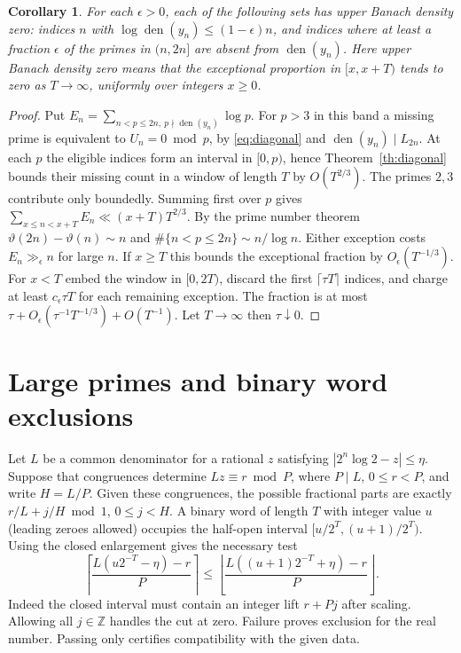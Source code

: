 \documentclass[11pt]{article}
\newtheorem{corollary}[theorem]{Corollary}
\DeclareMathOperator{\den}{den}
\newcommand{\Z}{\mathbb Z}
\begin{document}
\begin{corollary}\label{cor:uniform}
For each $\epsilon>0$, each of the following sets has upper Banach density zero:
indices $n$ with $\log\den(y_n)\le(1-\epsilon)n$, and indices where at least
a fraction $\epsilon$ of the primes in $(n,2n]$ are absent from $\den(y_n)$.
Here upper Banach density zero means that the exceptional proportion in
$[x,x+T)$ tends to zero as $T\to\infty$, uniformly over integers $x\ge0$.
\end{corollary}
\begin{proof}
Put $E_n=\sum_{n<p\le2n,\ p\nmid\den(y_n)}\log p$. For $p>3$ in this band
a missing prime is equivalent to $U_n=0\bmod p$, by \eqref{eq:diagonal}
and $\den(y_n)\mid L_{2n}$. At each $p$ the eligible indices form an interval
in $[0,p)$, hence Theorem~\ref{th:diagonal} bounds their missing count in a
window of length $T$ by $O(T^{2/3})$. The primes $2,3$ contribute only
boundedly. Summing first over $p$ gives
$\sum_{x\le n<x+T}E_n\ll (x+T)T^{2/3}$.
By the prime number theorem $\vartheta(2n)-\vartheta(n)\sim n$ and
$\#\{n<p\le2n\}\sim n/\log n$. Either exception costs $E_n\gg_\epsilon n$
for large $n$. If $x\ge T$ this bounds the exceptional fraction by
$O_\epsilon(T^{-1/3})$. For $x<T$ embed the window in $[0,2T)$, discard the
first $\lceil\tau T\rceil$ indices, and charge at least
$c_\epsilon\tau T$ for each remaining exception. The fraction is at most
$\tau+O_\epsilon(\tau^{-1}T^{-1/3})+O(T^{-1})$. Let $T\to\infty$ then
$\tau\downarrow0$.
\end{proof}

\section{Large primes and binary word exclusions}\label{sec:sieve}
Let $L$ be a common denominator for a rational $z$ satisfying
$|2^n\log2-z|\le\eta$. Suppose that congruences determine
$Lz\equiv r\bmod P$, where $P\mid L$, $0\le r<P$, and write $H=L/P$.
Given these congruences, the possible fractional parts are exactly
$r/L+j/H\bmod1$, $0\le j<H$. A binary word of length $T$ with integer value
$u$ (leading zeroes allowed) occupies the half-open interval
$[u/2^T,(u+1)/2^T)$. Using the closed enlargement gives the necessary test
\begin{equation}
 \left\lceil\frac{L(u2^{-T}-\eta)-r}{P}\right\rceil
 \le
 \left\lfloor\frac{L((u+1)2^{-T}+\eta)-r}{P}\right\rfloor .
 \label{eq:grid}
\end{equation}
Indeed the closed interval must contain an integer lift $r+Pj$ after scaling.
Allowing all $j\in\Z$ handles the cut at zero. Failure proves exclusion for
the real number. Passing only certifies compatibility with the given data.
\end{document}
